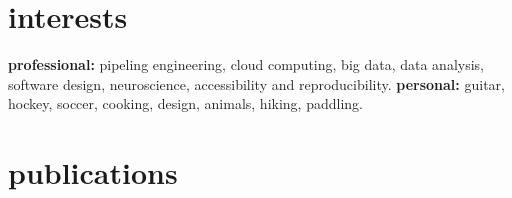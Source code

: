\documentclass[]{friggeri-cv} %
\begin{document}
\section{interests}

\textbf{professional:} pipeling engineering, cloud computing, big data, data analysis,
software design, neuroscience, accessibility and reproducibility. \textbf{personal:} guitar,
hockey, soccer, cooking, design, animals, hiking, paddling.


\section{publications}






\end{document}
